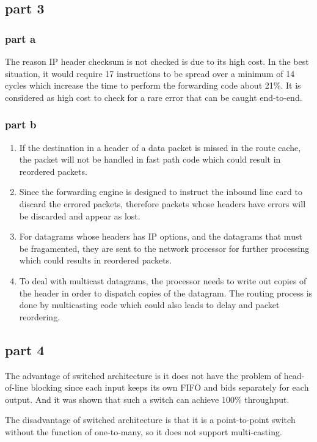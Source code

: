 \subsection{part 3}
\subsubsection{part a}
The reason IP header checksum is not checked is due to its high cost. In the best situation, it would require 17 instructions to be spread over a minimum of 14 cycles which increase the time to perform the forwarding code about 21\%. It is considered as high cost to check for a rare error that can be caught end-to-end.

\subsubsection{part b}
\begin{enumerate}
\item If the destination in a header of a data packet is missed in the route cache, the packet will not be handled in fast path code which could result in reordered packets.
\item Since the forwarding engine is designed to instruct the inbound line card to discard the errored packets, therefore packets whose headers have errors will be discarded and appear as lost.
\item For datagrams whose headers has IP options, and the datagrams that must be fragamented, they are sent to the network processor for further processing which could results in reordered packets.
\item To deal with multicast datagrams, the processor needs to write out copies of the header in order to dispatch copies of the datagram. The routing process is done by multicasting code which could also leads to delay and packet reordering.
\end{enumerate}

\subsection{part 4}
The advantage of switched architecture is it does not have the problem of head-of-line blocking since each input keeps its own FIFO and bids separately for each output. And it was shown that such a switch can achieve 100\% throughput.

The disadvantage of switched architecture is that it is a point-to-point switch without the function of one-to-many, so it does not support multi-casting.

